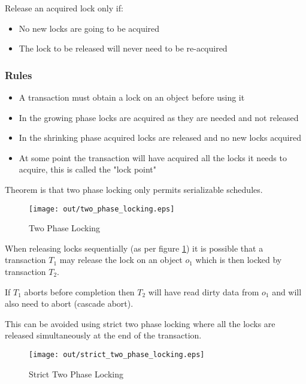 \documentclass[a4paper]{article}
\begin{document}
Release an acquired lock only if:

\begin{itemize}
  \item No new locks are going to be acquired
  \item The lock to be released will never need to be re-acquired
\end{itemize}

\subsubsection{Rules}

\begin{itemize}
  \item A transaction must obtain a lock on an object before using it
  \item In the growing phase locks are acquired as they are needed and not
        released
  \item In the shrinking phase acquired locks are released and no new locks
        acquired
  \item At some point the transaction will have acquired all the locks it needs
        to acquire, this is called the "lock point"
\end{itemize}

Theorem is that two phase locking only permits serializable schedules.

\begin{figure}[h!]
  \centering
  \texttt{[image: out/two\_phase\_locking.eps]}
  \caption{Two Phase Locking}
  \label{fig:two_phase_locking}
\end{figure}
\FloatBarrier

When releasing locks sequentially (as per figure \ref{fig:two_phase_locking}) it
is possible that a transaction $T_{1}$ may release the lock on an object $o_{1}$
which is then locked by transaction $T_{2}$.

If $T_{1}$ aborts before completion then $T_{2}$ will have read dirty data from
$o_{1}$ and will also need to abort (cascade abort).

This can be avoided using strict two phase locking where all the locks are
released simultaneously at the end of the transaction.

\begin{figure}[h!]
  \centering
  \texttt{[image: out/strict\_two\_phase\_locking.eps]}
  \caption{Strict Two Phase Locking}
  \label{fig:strict_two_phase_locking}
\end{figure}
\FloatBarrier
\end{document}
